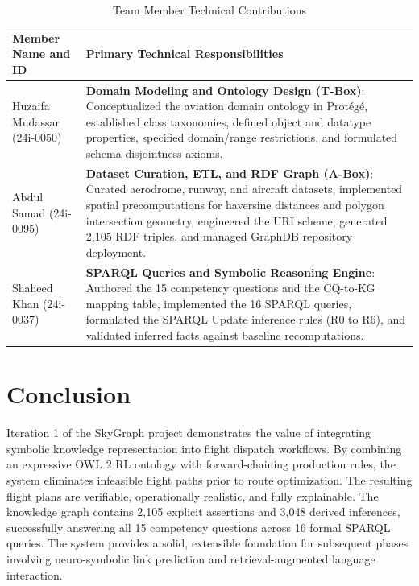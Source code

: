 \documentclass[conference]{IEEEtran}
\begin{document}
\begin{table}[htbp]
\caption{Team Member Technical Contributions}
\label{tab:member_contributions}
\centering
\begin{tabular}{lp{5.0cm}}
\toprule
\textbf{Member Name and ID} & \textbf{Primary Technical Responsibilities} \\
\midrule
Huzaifa Mudassar \newline (24i-0050) & \textbf{Domain Modeling and Ontology Design (T-Box)}: Conceptualized the aviation domain ontology in Protégé, established class taxonomies, defined object and datatype properties, specified domain/range restrictions, and formulated schema disjointness axioms. \\
\midrule
Abdul Samad \newline (24i-0095) & \textbf{Dataset Curation, ETL, and RDF Graph (A-Box)}: Curated aerodrome, runway, and aircraft datasets, implemented spatial precomputations for haversine distances and polygon intersection geometry, engineered the URI scheme, generated 2,105 RDF triples, and managed GraphDB repository deployment. \\
\midrule
Shaheed Khan \newline (24i-0037) & \textbf{SPARQL Queries and Symbolic Reasoning Engine}: Authored the 15 competency questions and the CQ-to-KG mapping table, implemented the 16 SPARQL queries, formulated the SPARQL Update inference rules (R0 to R6), and validated inferred facts against baseline recomputations. \\
\bottomrule
\end{tabular}
\end{table}

\section{Conclusion}
Iteration 1 of the SkyGraph project demonstrates the value of integrating symbolic knowledge representation into flight dispatch workflows. By combining an expressive OWL 2 RL ontology with forward-chaining production rules, the system eliminates infeasible flight paths prior to route optimization. The resulting flight plans are verifiable, operationally realistic, and fully explainable. The knowledge graph contains 2,105 explicit assertions and 3,048 derived inferences, successfully answering all 15 competency questions across 16 formal SPARQL queries. The system provides a solid, extensible foundation for subsequent phases involving neuro-symbolic link prediction and retrieval-augmented language interaction.
\end{document}
